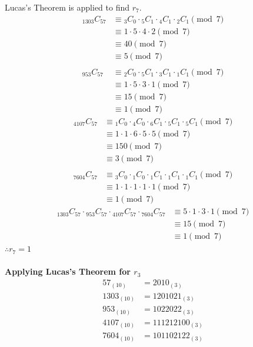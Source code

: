 \documentclass{article}
\begin{document}
Lucas's Theorem is applied to find $r_7$.
\begin{align*}
    {}_{1303}C_{57}
    &\equiv {}_{3}C_{0}\cdot{}_{5}C_{1}\cdot{}_{4}C_{1}\cdot{}_{2}C_{1} \pmod{7} \\
    &\equiv 1\cdot5\cdot4\cdot2 \pmod{7} \\
    &\equiv 40 \pmod{7} \\
    &\equiv 5 \pmod{7}
    \\\\
    {}_{953}C_{57}
    &\equiv {}_{2}C_{0}\cdot{}_{5}C_{1}\cdot{}_{3}C_{1}\cdot{}_{1}C_{1} \pmod{7} \\
    &\equiv 1\cdot5\cdot3\cdot1 \pmod{7} \\
    &\equiv 15 \pmod{7} \\
    &\equiv 1 \pmod{7}
\end{align*}
\begin{align*}
    {}_{4107}C_{57}
    &\equiv {}_{1}C_{0}\cdot{}_{4}C_{0}\cdot{}_{6}C_{1}\cdot{}_{5}C_{1}\cdot{}_{5}C_{1} \pmod{7} \\
    &\equiv 1\cdot1\cdot6\cdot5\cdot5 \pmod{7} \\
    &\equiv 150 \pmod{7} \\
    &\equiv 3 \pmod{7}
    \\\\
    {}_{7604}C_{57}
    &\equiv {}_{3}C_{0}\cdot{}_{1}C_{0}\cdot{}_{1}C_{1}\cdot{}_{1}C_{1}\cdot{}_{1}C_{1} \pmod{7} \\
    &\equiv 1\cdot1\cdot1\cdot1\cdot1 \pmod{7} \\
    &\equiv 1 \pmod{7}  
\end{align*}
\begin{align*}
    {}_{1303}C_{57}\cdot{}_{953}C_{57}\cdot{}_{4107}C_{57}\cdot{}_{7604}C_{57} &\equiv 5\cdot1\cdot3\cdot1 \pmod{7} \\
    &\equiv 15 \pmod{7} \\
    &\equiv 1 \pmod{7}
\end{align*}
$\therefore r_7=1$
\\\\
\textbf{Applying Lucas's Theorem for $r_3$}
\begin{align*}
57_{(10)}&=2010_{(3)} \\
1303_{(10)}&=1201021_{(3)} \\
953_{(10)}&=1022022_{(3)} \\
4107_{(10)}&=111212100_{(3)} \\
7604_{(10)}&=101102122_{(3)} \\
\end{align*}
\end{document}
